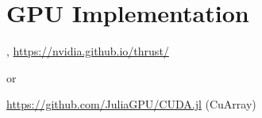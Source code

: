 \section{GPU Implementation}

\textcite{bellChapter26Thrust2012}, \url{https://nvidia.github.io/thrust/}

or

\url{https://github.com/JuliaGPU/CUDA.jl} (CuArray)